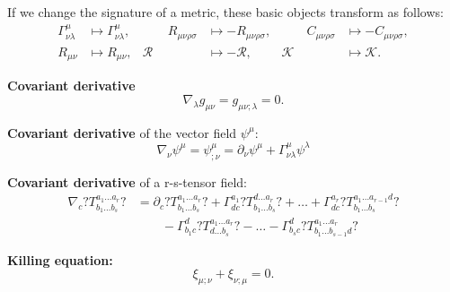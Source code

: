 \documentclass[10pt,twoside,notitlepage,a4paper,fleqn,openbib]{report}
\begin{document}
If we change the signature of a metric, these basic objects transform as follows:
\begin{subequations}
\begin{alignat}{5}
  \Gamma_{\nu\lambda}^{\mu}&\mapsto \Gamma_{\nu\lambda}^{\mu}, &\qquad R_{\mu\nu\rho\sigma}&\mapsto -R_{\mu\nu\rho\sigma}, &\qquad C_{\mu\nu\rho\sigma}&\mapsto -C_{\mu\nu\rho\sigma},\\
  R_{\mu\nu} &\mapsto R_{\mu\nu}, & \mathcal{R} &\mapsto -\mathcal{R}, & \mathcal{K} &\mapsto \mathcal{K}.
\end{alignat}
\end{subequations}

{\bf Covariant derivative}
\begin{equation}
 \nabla_{\lambda}g_{\mu\nu} = g_{\mu\nu;\lambda} = 0.
\end{equation}

{\bf Covariant derivative} of the vector field $\psi^{\mu}$:
\begin{equation}
  \nabla_{\nu}\psi^{\mu} = \psi^{\mu}_{;\nu} = \partial_{\nu}\psi^{\mu}+\Gamma_{\nu\lambda}^{\mu}\psi^{\lambda}
\end{equation}

{\bf Covariant derivative} of a r-s-tensor field:
\begin{equation}
\begin{aligned}
 \nabla_c?T^{a_1\ldots a_r}_{b_1\ldots b_s}? &= \partial_c?T^{a_1\ldots a_r}_{b_1\ldots b_s}?+\Gamma_{dc}^{a_1}?T^{d\ldots a_r}_{b_1\ldots b_s}?+\ldots +\Gamma_{dc}^{a_r}?T^{a_1\ldots a_{r-1}d}_{b_1\ldots b_s}?\\
  &\qquad - \Gamma_{b_1c}^d?T^{a_1\ldots a_r}_{d\ldots b_s}?-\ldots -\Gamma_{b_sc}^d?T^{a_1\ldots a_r}_{b_1\ldots b_{s-1}d}?
\end{aligned}
\end{equation}

{\bf Killing equation:}
\begin{equation}
 \label{eq:killing}
 \xi_{\mu;\nu}+\xi_{\nu;\mu}=0.
\end{equation}


\end{document}
